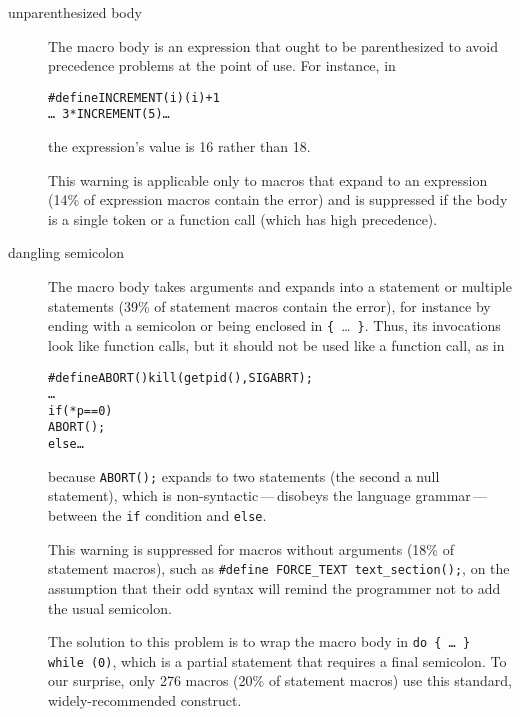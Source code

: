 \documentclass[10pt]{article}
\begin{document}
\begin{description}
\item[unparenthesized body]
        The macro body is an expression that ought to be parenthesized to
        avoid precedence problems at the point of use.  For instance, in
\begin{alltt}
    #define INCREMENT(i) (i)+1
    \ldots\ 3*INCREMENT(5) \ldots
\end{alltt}
        the expression's value is 16 rather than 18.
        
        This warning is applicable only to macros that expand to an
        expression (14\% of expression macros contain the error) and is
        suppressed if the body is a single token or a function call (which
        has high precedence).

\item[dangling semicolon]\label{item:swallow-semicolon}
        The macro body takes arguments and expands into a statement or
        multiple statements (39\% of statement macros contain the error),
        for instance by ending with a semicolon or being enclosed in
        \verb|{|~\ldots~\verb|}|.
        Thus, its invocations look like function calls, but it should not
        be used like a function call, as in
\begin{alltt}
    #define ABORT() kill(getpid(),SIGABRT);
    \ldots
    if (*p == 0)
      ABORT();
    else \ldots
\end{alltt}
        because {\tt ABORT();} expands to two statements (the second a null
        statement), which is non-syntactic\,---\,disobeys the language
        grammar\,---\,between the {\tt if} condition and
        {\tt else}.
        
        
        This warning is suppressed for macros without arguments (18\% of
        statement macros), such as {\tt \#define \verb|FORCE_TEXT|
        \verb|text_section|();}, on the assumption that their odd syntax
        will remind the programmer not to add the usual semicolon.

        
        The solution to this problem is to wrap the macro body in {\tt do
        \verb|{| \ldots\ \verb|}| while (0)}, which is a partial statement
      that requires a final semicolon.  To our surprise, only 276 macros
      (20\% of statement macros) use this standard, widely-recommended
      construct.


\end{description}
\end{document}
